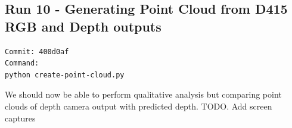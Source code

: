 \subsection{Run 10 -  Generating Point Cloud from D415 RGB and Depth outputs}
\label{app_res:10}
\begin{verbatim}
Commit: 400d0af
Command: 
python create-point-cloud.py
\end{verbatim}
We should now be able to perform qualitative analysis but comparing point clouds of depth camera output with predicted depth.
TODO. Add screen captures










